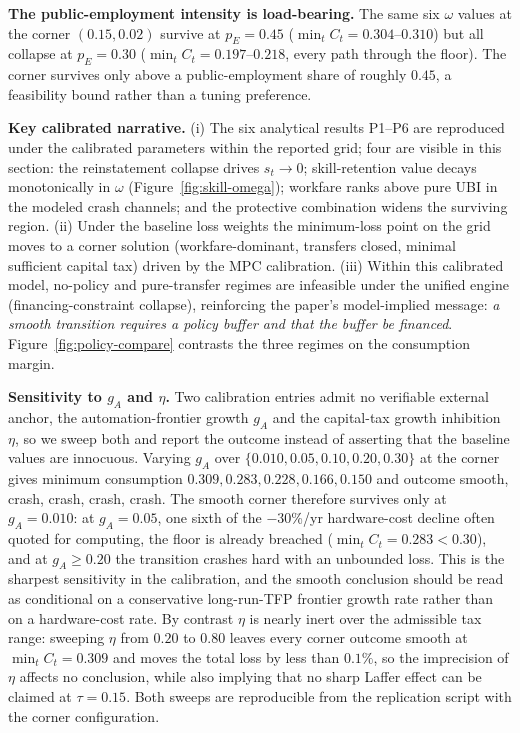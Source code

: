 \documentclass[review,12pt]{elsarticle}
\theoremstyle{plain}
\theoremstyle{definition}
\theoremstyle{remark}
\begin{document}
\smallskip\noindent\textbf{The public-employment intensity is load-bearing.} The same six $\omega$ values at the corner $(0.15,0.02)$ survive at $p_E=0.45$ ($\min_tC_t=0.304$--$0.310$) but all collapse at $p_E=0.30$ ($\min_tC_t=0.197$--$0.218$, every path through the floor). The corner survives only above a public-employment share of roughly $0.45$, a feasibility bound rather than a tuning preference.



\textbf{Key calibrated narrative.} (i) The six analytical results P1--P6 are reproduced under the calibrated parameters within the reported grid; four are visible in this section: the reinstatement collapse drives $s_t\to0$; skill-retention value decays monotonically in $\omega$ (Figure~\ref{fig:skill-omega}); workfare ranks above pure UBI in the modeled crash channels; and the protective combination widens the surviving region. (ii) Under the baseline loss weights the minimum-loss point on the grid moves to a corner solution (workfare-dominant, transfers closed, minimal sufficient capital tax) driven by the MPC calibration. (iii) Within this calibrated model, no-policy and pure-transfer regimes are infeasible under the unified engine (financing-constraint collapse), reinforcing the paper's model-implied message: \emph{a smooth transition requires a policy buffer and that the buffer be financed}. Figure~\ref{fig:policy-compare} contrasts the three regimes on the consumption margin.

\smallskip\noindent\textbf{Sensitivity to $g_A$ and $\eta$.} Two calibration entries admit no verifiable external anchor, the automation-frontier growth $g_A$ and the capital-tax growth inhibition $\eta$, so we sweep both and report the outcome instead of asserting that the baseline values are innocuous. Varying $g_A$ over $\{0.010,0.05,0.10,0.20,0.30\}$ at the corner gives minimum consumption $0.309,0.283,0.228,0.166,0.150$ and outcome smooth, crash, crash, crash, crash. The smooth corner therefore survives only at $g_A=0.010$: at $g_A=0.05$, one sixth of the $-$30\%/yr hardware-cost decline often quoted for computing, the floor is already breached ($\min_tC_t=0.283<0.30$), and at $g_A\ge0.20$ the transition crashes hard with an unbounded loss. This is the sharpest sensitivity in the calibration, and the smooth conclusion should be read as conditional on a conservative long-run-TFP frontier growth rate rather than on a hardware-cost rate. By contrast $\eta$ is nearly inert over the admissible tax range: sweeping $\eta$ from $0.20$ to $0.80$ leaves every corner outcome smooth at $\min_tC_t=0.309$ and moves the total loss by less than $0.1\%$, so the imprecision of $\eta$ affects no conclusion, while also implying that no sharp Laffer effect can be claimed at $\tau=0.15$. Both sweeps are reproducible from the replication script with the corner configuration.
\end{document}
